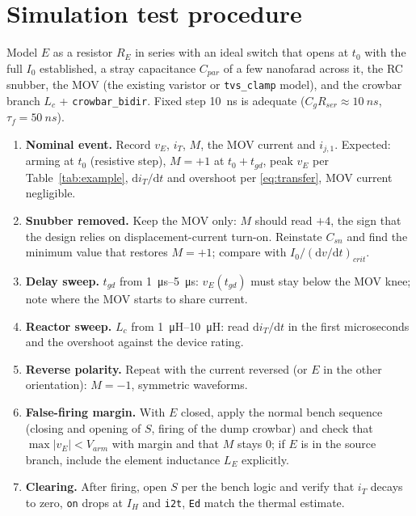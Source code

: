 \documentclass[11pt,a4paper]{article}
\begin{document}
\section{Simulation test procedure}

Model $E$ as a resistor $R_E$ in series with an ideal switch that opens at $t_0$ with the
full $I_0$ established, a stray capacitance $C_{par}$ of a few nanofarad across it, the RC
snubber, the MOV (the existing varistor or \texttt{tvs\_clamp} model), and the crowbar
branch $L_c$ + \texttt{crowbar\_bidir}. Fixed step \SI{10}{ns} is adequate
($C_g R_{ser} \approx \SI{10}{ns}$, $\tau_f = \SI{50}{ns}$).

\begin{enumerate}
\item \textbf{Nominal event.} Record $v_E$, $i_T$, $M$, the MOV current and $i_{j,1}$.
      Expected: arming at $t_0$ (resistive step), $M = +1$ at $t_0 + t_{gd}$, peak $v_E$ per
      Table~\ref{tab:example}, $\mathrm{d}i_T/\mathrm{d}t$ and overshoot per \eqref{eq:transfer},
      MOV current negligible.
\item \textbf{Snubber removed.} Keep the MOV only: $M$ should read $+4$, the sign that the
      design relies on displacement-current turn-on. Reinstate $C_{sn}$ and find the minimum
      value that restores $M = +1$; compare with $I_0/(\mathrm{d}v/\mathrm{d}t)_{crit}$.
\item \textbf{Delay sweep.} $t_{gd}$ from \SIrange{1}{5}{\micro s}: $v_E(t_{gd})$ must stay below
      the MOV knee; note where the MOV starts to share current.
\item \textbf{Reactor sweep.} $L_c$ from \SIrange{1}{10}{\micro H}: read $\mathrm{d}i_T/\mathrm{d}t$
      in the first microseconds and the overshoot against the device rating.
\item \textbf{Reverse polarity.} Repeat with the current reversed (or $E$ in the other
      orientation): $M = -1$, symmetric waveforms.
\item \textbf{False-firing margin.} With $E$ closed, apply the normal bench sequence
      (closing and opening of $S$, firing of the dump crowbar) and check that
      $\max |v_E| < V_{arm}$ with margin and that $M$ stays 0; if $E$ is in the source branch,
      include the element inductance $L_E$ explicitly.
\item \textbf{Clearing.} After firing, open $S$ per the bench logic and verify that $i_T$
      decays to zero, \texttt{on} drops at $I_H$ and \texttt{i2t}, \texttt{Ed} match the
      thermal estimate.
\end{enumerate}
\end{document}
